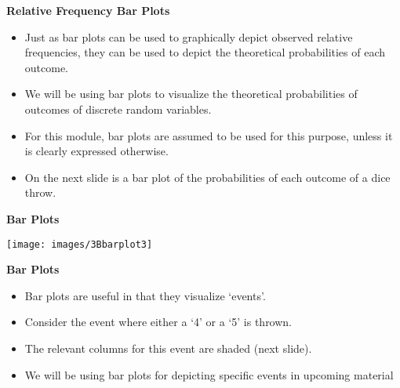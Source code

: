 \documentclass[]{report}
\begin{document}

{
\textbf{Relative Frequency Bar Plots}

\begin{itemize}
\item Just as bar plots can be used to graphically depict observed relative frequencies, they can be used to
depict the theoretical probabilities of each outcome.
\item We will be using bar plots to visualize the theoretical probabilities of outcomes of discrete random variables.
\item For this module, bar plots are assumed to be used for this purpose, unless it is clearly expressed otherwise.
\item On the next slide is a bar plot of the probabilities of each outcome of a dice throw.
\end{itemize}

}



{
\textbf{Bar Plots}
\begin{center}
\texttt{[image: images/3Bbarplot3]}
\end{center}
}

{
\textbf{Bar Plots}

\begin{itemize}
\item Bar plots are useful in that they visualize `events'.
\item Consider the event where either a `4' or a `5' is thrown.
\item The relevant columns for this event are shaded (next slide).
\item We will be using bar plots for depicting specific events in upcoming material
\end{itemize}

}
\end{document}
